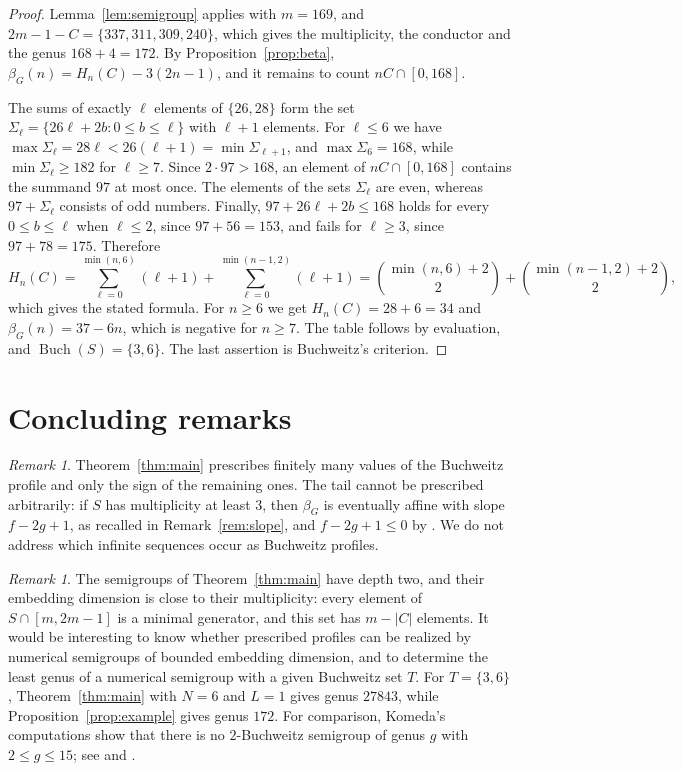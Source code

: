 \documentclass[11pt]{amsart}
\theoremstyle{definition}
\theoremstyle{remark}
\newtheorem{remark}[theorem]{Remark}
\numberwithin{equation}{section}
\newcommand{\Buch}{\operatorname{Buch}}
\begin{document}
\begin{proof}
Lemma~\ref{lem:semigroup} applies with $m=169$, and $2m-1-C=\{337,311,309,240\}$, which gives the multiplicity, the conductor and the genus $168+4=172$. By Proposition~\ref{prop:beta}, $\beta_G(n)=H_n(C)-3(2n-1)$, and it remains to count $nC\cap[0,168]$.

The sums of exactly $\ell$ elements of $\{26,28\}$ form the set $\Sigma_\ell=\{26\ell+2b:0\le b\le\ell\}$ with $\ell+1$ elements. For $\ell\le 6$ we have $\max\Sigma_\ell=28\ell<26(\ell+1)=\min\Sigma_{\ell+1}$, and $\max\Sigma_6=168$, while $\min\Sigma_\ell\ge 182$ for $\ell\ge 7$. Since $2\cdot 97>168$, an element of $nC\cap[0,168]$ contains the summand $97$ at most once. The elements of the sets $\Sigma_\ell$ are even, whereas $97+\Sigma_\ell$ consists of odd numbers. Finally, $97+26\ell+2b\le 168$ holds for every $0\le b\le\ell$ when $\ell\le 2$, since $97+56=153$, and fails for $\ell\ge 3$, since $97+78=175$. Therefore
\[
H_n(C)=\sum_{\ell=0}^{\min(n,6)}(\ell+1)+\sum_{\ell=0}^{\min(n-1,2)}(\ell+1)=\binom{\min(n,6)+2}{2}+\binom{\min(n-1,2)+2}{2},
\]
which gives the stated formula. For $n\ge 6$ we get $H_n(C)=28+6=34$ and $\beta_G(n)=37-6n$, which is negative for $n\ge 7$. The table follows by evaluation, and $\Buch(S)=\{3,6\}$. The last assertion is Buchweitz's criterion.
\end{proof}

\section{Concluding remarks}\label{sec:remarks}

\begin{remark}
Theorem~\ref{thm:main} prescribes finitely many values of the Buchweitz profile and only the sign of the remaining ones. The tail cannot be prescribed arbitrarily: if $S$ has multiplicity at least $3$, then $\beta_G$ is eventually affine with slope $f-2g+1$, as recalled in Remark~\ref{rem:slope}, and $f-2g+1\le 0$ by \cite[Proposition~3.2]{EGMV23}. We do not address which infinite sequences occur as Buchweitz profiles.
\end{remark}

\begin{remark}
The semigroups of Theorem~\ref{thm:main} have depth two, and their embedding dimension is close to their multiplicity: every element of $S\cap[m,2m-1]$ is a minimal generator, and this set has $m-|C|$ elements. It would be interesting to know whether prescribed profiles can be realized by numerical semigroups of bounded embedding dimension, and to determine the least genus of a numerical semigroup with a given Buchweitz set $T$. For $T=\{3,6\}$, Theorem~\ref{thm:main} with $N=6$ and $L=1$ gives genus $27843$, while Proposition~\ref{prop:example} gives genus $172$. For comparison, Komeda's computations show that there is no $2$-Buchweitz semigroup of genus $g$ with $2\le g\le 15$; see \cite[p.~161]{Kom98} and \cite[Section~2]{GMTV21}.
\end{remark}
\end{document}
